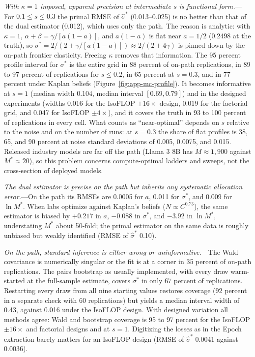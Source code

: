 \emph{With $\kappa=1$ imposed, apparent precision at intermediate $s$ is functional form.}---For
$0.1\le s\le0.3$ the primal RMSE of $\hat\sigma^*$ (0.013--0.025) is no better than that of the dual estimator
(0.012), which uses only the path. The reason is analytic: with $\kappa=1$, $\alpha+\beta=\gamma/[a(1-a)]$, and
$a(1-a)$ is flat near $a=1/2$ (0.2498 at the truth), so $\sigma^*=2/(2+\gamma/[a(1-a)])\approx2/(2+4\gamma)$ is
pinned down by the on-path frontier elasticity. Freeing $\kappa$ removes that information. The 95 percent
profile interval for $\sigma^*$ is the entire grid in 88 percent of on-path replications, in 89 to 97 percent of
replications for $s\le0.2$, in 65 percent at $s=0.3$, and in 77 percent under Kaplan beliefs
(Figure~\ref{fig:app-mc-profile}). It becomes informative at $s=1$ (median width 0.104, median interval
$[0.69,0.79]$) and in the designed experiments (widths 0.016 for the IsoFLOP $\pm16\times$ design, 0.019 for the
factorial grid, and 0.047 for IsoFLOP $\pm4\times$), and it covers the truth in 93 to 100 percent of replications
in every cell. What counts as ``near-optimal'' depends on $s$ relative to the noise and on the number of runs: at
$s=0.3$ the share of flat profiles is 38, 65, and 90 percent at noise standard deviations of 0.005, 0.0075, and
0.015. Released industry models are far off the path (Llama 3 8B has $M\approx1{,}900$ against $M^*\approx20$), so
this problem concerns compute-optimal ladders and sweeps, not the cross-section of deployed models.

\emph{The dual estimator is precise on the path but inherits any systematic allocation error.}---On the path its
RMSEs are 0.0005 for $a$, 0.011 for $\sigma^*$, and 0.009 for $\ln M^*$. When labs optimize against Kaplan's
beliefs ($N\propto C^{0.73}$), the same estimator is biased by $+0.217$ in $a$, $-0.088$ in $\sigma^*$, and
$-3.92$ in $\ln M^*$, understating $M^*$ about 50-fold; the primal estimator on the same data is roughly unbiased
but weakly identified (RMSE of $\hat\sigma^*$ 0.10).

\emph{On the path, standard inference is either wrong or uninformative.}---The Wald covariance is numerically
singular or the fit is at a corner in 35 percent of on-path replications. The pairs bootstrap as usually
implemented, with every draw warm-started at the full-sample estimate, covers $\sigma^*$ in only 67 percent of
replications. Restarting every draw from all nine starting values restores coverage (92 percent in a separate
check with 60 replications) but yields a median interval width of 0.43, against 0.016 under the IsoFLOP design.
With designed variation all methods agree: Wald and bootstrap coverage is 95 to 97 percent for the IsoFLOP $\pm16\times$
and factorial designs and at $s=1$. Digitizing the losses as in the Epoch extraction barely matters for an IsoFLOP
design (RMSE of $\hat\sigma^*$ 0.0041 against 0.0036).

